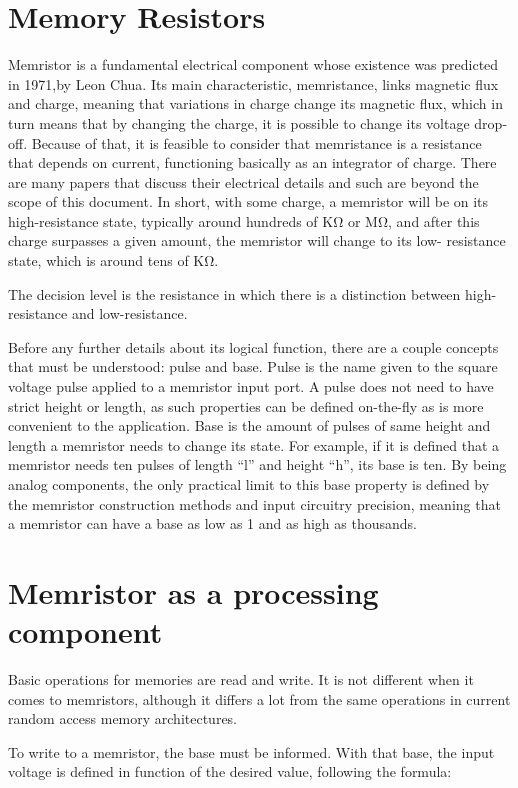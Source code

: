\documentclass[ecp,tc,english]{iiufrgs}
\begin{document}
\chapter{Memory Resistors}

Memristor is a fundamental electrical component whose existence was predicted in 1971,by Leon Chua. Its main characteristic, memristance, links magnetic flux and charge, meaning that variations in charge change its magnetic flux, which in turn means that by changing the charge, it is possible to change its voltage drop-off. Because of that, it is feasible to consider that memristance is a resistance that depends on current, functioning basically as an integrator of charge. There are many papers that discuss their electrical details and such are beyond the scope of this document. In short, with some charge, a memristor will be on its high-resistance state, typically around hundreds of KΩ or MΩ, and after this charge surpasses a given amount, the memristor will change to its low- resistance state, which is around tens of KΩ.

The decision level is the resistance in which there is a distinction between high- resistance and low-resistance.

Before any further details about its logical function, there are a couple concepts that must be understood: pulse and base. Pulse is the name given to the square voltage pulse applied to a memristor input port. A pulse does not need to have strict height or length, as such properties can be defined on-the-fly as is more convenient to the application. Base is the amount of pulses of same height and length a memristor needs to change its state. For example, if it is defined that a memristor needs ten pulses of length “l” and height “h”, its base is ten. By being analog components, the only practical limit to this base property is defined by the memristor construction methods and input circuitry precision, meaning that a memristor can have a base as low as 1 and as high as thousands.

\chapter{Memristor as a processing component}

Basic operations for memories are read and write. It is not different when it comes to memristors, although it differs a lot from the same operations in current random access memory architectures.

To write to a memristor, the base must be informed. With that base, the input voltage is defined in function of the desired value, following the formula:
\end{document}
